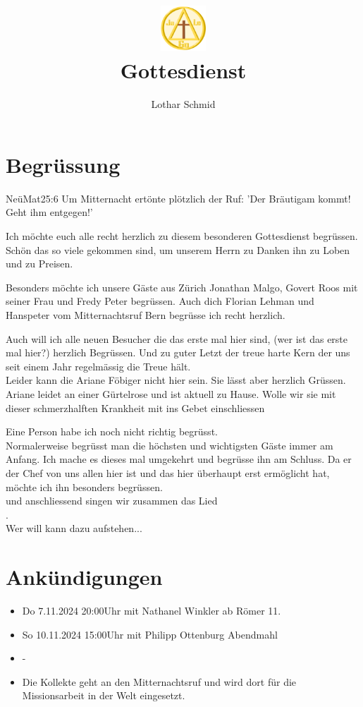 \documentclass{../inc/mybib}
\title{\includegraphics[height=48pt]{assets/images/logo.png}\\Gottesdienst}
\author{Lothar Schmid}
\begin{document}
\maketitle
\section{Begrüssung}

\begin{bibeltext}{Neü}{Mat}{25:6}
Um Mitternacht ertönte plötzlich der Ruf: 'Der Bräutigam kommt! Geht ihm entgegen!'
\end{bibeltext}
Ich möchte euch alle recht herzlich zu diesem besonderen Gottesdienst begrüssen. Schön das so viele gekommen sind, um unserem Herrn zu Danken ihn zu Loben und zu Preisen.

Besonders möchte ich unsere Gäste aus Zürich Jonathan Malgo, Govert Roos mit seiner Frau  und Fredy Peter begrüssen. Auch dich Florian Lehman und Hanspeter vom Mitternachtsruf Bern begrüsse ich recht herzlich.

Auch will ich alle neuen Besucher die das erste mal hier sind, (wer ist das erste mal hier?) herzlich Begrüssen. Und zu guter Letzt der treue harte Kern der uns seit einem Jahr regelmässig die Treue hält.\\
Leider kann die Ariane Föbiger nicht hier sein. Sie lässt aber herzlich Grüssen. Ariane leidet an einer Gürtelrose und ist aktuell zu Hause. Wolle wir sie mit dieser schmerzhalften Krankheit mit ins Gebet einschliessen 

Eine Person habe ich noch nicht richtig begrüsst. \\
Normalerweise begrüsst man die höchsten und wichtigsten Gäste immer am Anfang. Ich mache es dieses mal umgekehrt und begrüsse ihn am Schluss. Da er der Chef von uns allen hier ist und das hier überhaupt erst ermöglicht hat, möchte ich ihn besonders begrüssen.\\
\beten{} und anschliessend singen wir zusammen das Lied\\
.\\
Wer will kann dazu aufstehen...

\section{Ankündigungen}
\begin{itemize}
    \item {} Do 7.11.2024 20:00Uhr mit Nathanel Winkler ab Römer 11.
    \item {} So 10.11.2024 15:00Uhr mit Philipp Ottenburg Abendmahl
    \item {} -
    \item {} Die Kollekte geht an den Mitternachtsruf und wird dort für die Missionsarbeit in der Welt eingesetzt.
\end{itemize}
\end{document}
